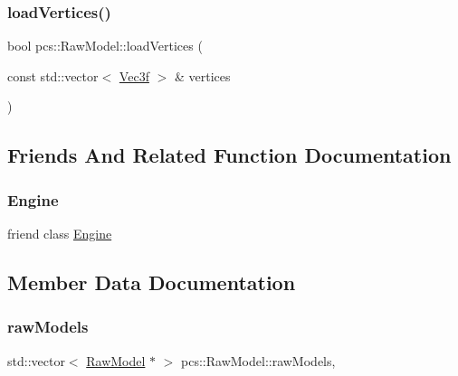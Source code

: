 \mbox{\label{classpcs_1_1RawModel_a5374bbadf5f2a6e19304a1a89ca8e54d}} 
\subsubsection{\texorpdfstring{load\+Vertices()}{loadVertices()}}
{\footnotesize\ttfamily bool pcs\+::\+Raw\+Model\+::load\+Vertices (\begin{DoxyParamCaption}\item[{const std\+::vector$<$ \hyperlink{namespacepcs_a68e0f517680976c17c810ffe6952cbab}{Vec3f} $>$ \&}]{vertices }\end{DoxyParamCaption})}



\subsection{Friends And Related Function Documentation}
\mbox{\label{classpcs_1_1RawModel_a3e1914489e4bed4f9f23cdeab34a43dc}} 
\subsubsection{\texorpdfstring{Engine}{Engine}}
{\footnotesize\ttfamily friend class \hyperlink{classpcs_1_1Engine}{Engine}\hspace{0.3cm}{\ttfamily [friend]}}



\subsection{Member Data Documentation}
\mbox{\label{classpcs_1_1RawModel_a49828e249759c0f359ebce06ad651332}} 
\subsubsection{\texorpdfstring{raw\+Models}{rawModels}}
{\footnotesize\ttfamily std\+::vector$<$ \hyperlink{classpcs_1_1RawModel}{Raw\+Model} $\ast$ $>$ pcs\+::\+Raw\+Model\+::raw\+Models\hspace{0.3cm}{\ttfamily [static]}, {\ttfamily [private]}}

